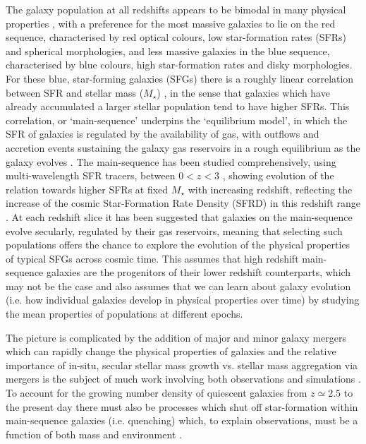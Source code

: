 \documentclass[fleqn,usenatbib]{mnras}
\begin{document}
The galaxy population at all redshifts appears to be bimodal in many physical properties \citep[e.g. as described in][]{Dekel2006}, with a preference for the most massive galaxies to lie on the red sequence, characterised by red optical colours, low star-formation rates (SFRs) and spherical morphologies, and less massive galaxies in the blue sequence, characterised by blue colours, high star-formation rates and disky morphologies. 
For these blue, star-forming galaxies (SFGs) there is a roughly linear correlation between SFR and stellar mass ($M_{\star}$) \citep[e.g.][]{Daddi2007,Noeske2007,Elbaz2007}, in the sense that galaxies which have already accumulated a larger stellar population tend to have higher SFRs.
This correlation, or `main-sequence' underpins the `equilibrium model', in which the SFR of galaxies is regulated by the availability of gas, with outflows and accretion events sustaining the galaxy gas reservoirs in a rough equilibrium as the galaxy evolves \citep[e.g.][]{Dave2012,Lilly2013,Saintonge2013}.
The main-sequence has been studied comprehensively, using multi-wavelength SFR tracers, between $0 < z < 3$ \citep[e.g.][]{Rodighiero2011,Karim2011,Whitaker2012,Behroozi2013b,Whitaker2014,Rodighiero2014,Speagle2014,Pannella2014,Sobral2014,Sparre2015,Lee2015,Schreiber2015,Renzini2015,Nelson2016}, showing evolution of the relation towards higher SFRs at fixed $M_{\star}$ with increasing redshift, reflecting the increase of the cosmic Star-Formation Rate Density (SFRD) in this redshift range \citep[e.g.][]{Madau_2014,Khostovan2015}.
At each redshift slice it has been suggested that galaxies on the main-sequence evolve secularly, regulated by their gas reservoirs, meaning that selecting such populations offers the chance to explore the evolution of the physical properties of typical SFGs across cosmic time.
This assumes that high redshift main-sequence galaxies are the progenitors of their lower redshift counterparts, which may not be the case \citep[e.g.][]{Gladders2013,Kelson2014,Abramson2016b} and also assumes that we can learn about galaxy evolution (i.e. how individual galaxies develop in physical properties over time) by studying the mean properties of populations at different epochs. 

The picture is complicated by the addition of major and minor galaxy mergers which can rapidly change the physical properties of galaxies \citep[e.g.][]{Toomre1977,Lotz2008,Conselice2011,Conselice2014} and the relative importance of in-situ, secular stellar mass growth vs. stellar mass aggregation via mergers is the subject of much work involving both observations and simulations \citep[e.g.][]{Robaina2009,Kaviraj2012,Stott2013,Lofthouse2017,Qu2017}. 
To account for the growing number density of quiescent galaxies from $z\simeq2.5$ to the present day \citep[e.g.][]{Bell2004,Faber2007,Brown2007,Ilbert2010,Brammer2011,Muzzin2013,Buitrago2013} there must also be processes which shut off star-formation within main-sequence galaxies (i.e. quenching) which, to explain observations, must be a function of both mass and environment \citep{Peng2010,Darvish2016}.
\end{document}
